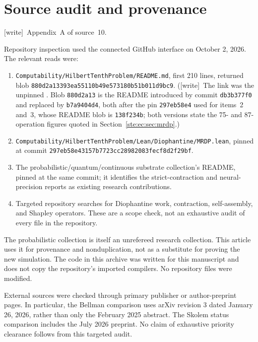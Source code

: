 \documentclass[11pt,letterpaper]{article}
\theoremstyle{definition}
\theoremstyle{remark}
\newcommand{\wtag}{\textup{[write]}}
\begin{document}
\section{Source audit and provenance}\label{ste:ec:app:audit}

\noindent\wtag\ Appendix~A of source~10.


Repository inspection used the connected GitHub interface on October 2,
2026. The relevant reads were:
\begin{enumerate}
\item \nolinkurl{Computability/HilbertTenthProblem/README.md}, first 210 lines,
      returned blob \texttt{880d2a13393ea55110b49e573180b51b011d9bc9}.
      (\wtag\ The link was the unpinned . Blob \texttt{880d2a13} is the README introduced by commit \texttt{db3b377f0} and replaced by \texttt{b7a9404d4}, both after the pin \texttt{297eb58e4} used for items~2 and~3, whose README blob is \texttt{138f234b}; both versions state the 75- and 87-operation figures quoted in Section~\ref{ste:ec:sec:mrdp}.)
\item \nolinkurl{Computability/HilbertTenthProblem/Lean/Diophantine/MRDP.lean},
      pinned at commit \texttt{297eb58e43157b7723cc28982083fecf8d2f29bf}.
\item The probabilistic/quantum/continuous substrate collection's README,
      pinned at the same commit; it identifies the strict-contraction and
      neural-precision reports as existing research contributions.
\item Targeted repository searches for Diophantine work, contraction,
      self-assembly, and Shapley operators. These are a scope check,
      not an exhaustive audit of every file in the repository.
\end{enumerate}

The probabilistic collection is itself an unrefereed research collection.
This article uses it for provenance and nonduplication, not as a substitute
for proving the new simulation. The code in this archive was written for
this manuscript and does not copy the repository's imported compilers.
No repository files were modified.

External sources were checked through primary publisher or author-preprint
pages. In particular, the Bellman comparison uses arXiv revision 3 dated
January 26, 2026, rather than only the February 2025 abstract. The Skolem
status comparison includes the July 2026 preprint. No claim of exhaustive
priority clearance follows from this targeted audit.
\end{document}
